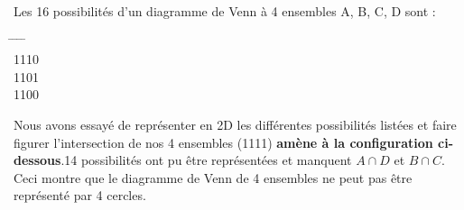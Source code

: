 \documentclass[9pt]{amsart}
\begin{document}
Les 16 possibilités d'un diagramme de Venn à 4 ensembles A, B, C, D sont : 
\begin{tabbing}
\hspace{1.5cm} \= \hspace{1.5cm} \= \hspace{1.5cm} \= \hspace{1.5cm} \=     \\
1110    \\
1101    \\
1100   
\end{tabbing}
 Nous avons essayé de représenter en 2D les différentes possibilités listées et faire figurer l'intersection de nos 4 ensembles (1111)
 \textbf{amène à la configuration ci-dessous}.14 possibilités ont pu être représentées et manquent $A \cap D$ et $B \cap C$. Ceci montre que le diagramme
 de Venn de 4 ensembles ne peut pas être représenté par 4 cercles.\newline
\end{document}
